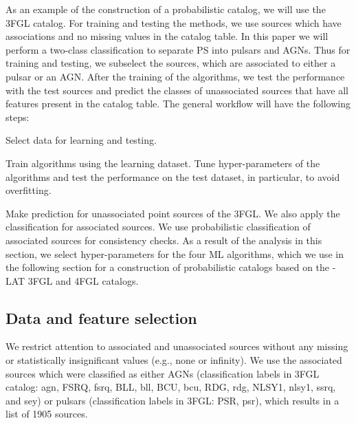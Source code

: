 As an example of the construction of a probabilistic catalog, we will use the 3FGL catalog.
For training and testing the methods, we use sources which have associations and no missing values in the catalog table.
In this paper we will perform a two-class classification to separate PS into pulsars and AGNs.
Thus for training and testing, we subselect the sources, which are associated to either a pulsar or an AGN.
After the training of the algorithms, we test the performance with the test sources and predict the classes of unassociated sources that have all features present in the catalog table.
The general workflow will have the following steps:
\ben
\item
Select data for learning and testing.
\item
Train algorithms using the learning dataset.
Tune hyper-parameters of the algorithms and test the performance on the test dataset, in particular, to avoid overfitting.
\item
Make prediction for unassociated point sources of the 3FGL.
We also apply the classification for associated sources. 
We use probabilistic classification of associated sources for consistency checks.
\een
As a result of the analysis in this section, we select hyper-parameters for the four ML algorithms,
which we use in the following section for a construction of probabilistic catalogs
based on the \Fermi-LAT 3FGL and 4FGL catalogs.


\subsection{Data and feature selection}

We restrict attention to associated and unassociated sources without any missing or statistically insignificant values (e.g., none or infinity). 
We use the associated sources which were classified as either AGNs (classification labels in 3FGL catalog: agn, FSRQ, fsrq, BLL, bll, BCU, bcu, RDG, rdg, NLSY1, nlsy1, ssrq, and sey) or pulsars (classification labels in 3FGL: PSR, psr), which results in a list of 1905 sources. 

